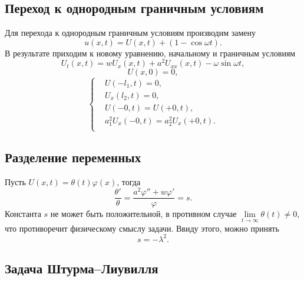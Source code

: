 \documentclass[12pt, a4paper]{article}
\begin{document}
\subsection{Переход к однородным граничным условиям}
Для перехода к однородным граничным условиям производим замену
\begin{equation}
  u(x,t) = U(x,t) + (1 - \cos \omega t).
\end{equation}
В результате приходим к новому уравнению, начальному и граничным условиям
\begin{equation}
  U_t(x,t) = w U_x(x,t) + a^2 U_{xx}(x,t) - \omega\sin\omega t,
  \label{eq:14}
\end{equation}
\begin{equation}
  U(x,0) = 0,
\end{equation}
\begin{equation}
  \left\{
  \begin{aligned}
    & U(-l_1,t) = 0, \\
    & U_x(l_2,t) = 0, \\
    & U(-0, t) = U(+0, t), \\
    & a_1^2 U_{x}(-0, t) = a_2^2 U_{x}(+0, t). \\
  \end{aligned}
  \right.
  \label{eq:15}
\end{equation}
\subsection{Разделение переменных}
Пусть $ U(x,t)=\theta(t)\varphi(x) $, тогда
\begin{equation}
  \frac{\theta'}{\theta}=\frac{a^2\varphi''+w\varphi'}{\varphi}=s.
  \label{eq:1}
\end{equation}
Константа $ s $ не может быть положительной, в противном случае $\lim\limits_{t \rightarrow \infty}\theta(t) \ne 0$, что противоречит физическому смыслу задачи. Ввиду этого, можно принять
\begin{equation}
  s=-\lambda^2.
  \label{eq:2}
\end{equation}
\subsection{Задача Штурма--Лиувилля}
\end{document}

